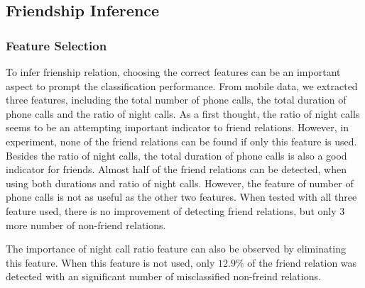 \documentclass[11pt]{article}
\begin{document}
\subsection{Friendship Inference}
\subsubsection{Feature Selection}
To infer frienship relation, choosing the correct features can be an important aspect to prompt the classification performance. From mobile data, we extracted three features, including the total number of phone calls, the total duration of phone calls and the ratio of night calls. As a first thought, the ratio of night calls seems to be an attempting important indicator to friend relations. However, in experiment, none of the friend relations can be found if only this feature is used. Besides the ratio of night calls, the total duration of phone calls is also a good indicator for friends. Almost half of the friend relations can be detected, when using both durations and ratio of night calls. However, the feature of number of phone calls is not as useful as the other two features. When tested with all three feature used, there is no improvement of detecting friend relations, but only 3 more number of non-friend relations.

The importance of night call ratio feature can also be observed by eliminating this feature. When this feature is not used, only $12.9\%$ of the friend relation was detected with an significant number of misclassified non-freind relations.


\end{document}

